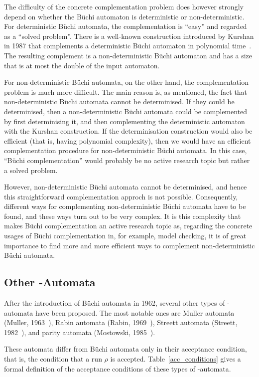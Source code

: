 The difficulty of the concrete complementation problem does however strongly depend on whether the Büchi automaton is deterministic or non-deterministic. For deterministic Büchi automata, the complementation is ``easy'' and regarded as a ``solved problem''. There is a well-known construction introduced by Kurshan in 1987 that complements a deterministic Büchi automaton in polynomial time~\cite{Kurshan198759}. The resulting complement is a non-deterministic Büchi automaton and has a size that is at most the double of the input automaton.

For non-deterministic Büchi automata, on the other hand, the complementation problem is much more difficult. The main reason is, as mentioned, the fact that non-deterministic Büchi automata cannot be determinised. If they could be determinised, then a non-deterministic Büchi automata could be complemented by first determinising it, and then complementing the deterministic automaton with the Kurshan construction. If the determinisation construction would also be efficient (that is, having polynomial complexity), then we would have an efficient complementation procedure for non-deterministic Büchi automata. In this case, ``Büchi complementation'' would probably be no active research topic but rather a solved problem.

However, non-deterministic Büchi automata cannot be determinised, and hence this straightforward complementation approch is not possible. Consequently, different ways for complementing non-deterministic Büchi automata have to be found, and these ways turn out to be very complex. It is this complexity that makes Büchi complementation an active research topic as, regarding the concrete usages of Büchi complementation in, for example, model checking, it is of great importance to find more and more efficient ways to complement non-deterministic Büchi automata. 


\subsection{Other \om-Automata}
After the introduction of Büchi automata in 1962, several other types of \om-automata have been proposed. The most notable ones are Muller automata (Muller, 1963~\cite{1963_muller}), Rabin automata (Rabin, 1969~\cite{rabin1969decidability}), Streett automata (Streett, 1982~\cite{Streett1982121}), and parity automata (Mostowski, 1985~\cite{1985_mostowski}).

These automata differ from Büchi automata only in their acceptance condition, that is, the condition that a run $\rho$ is accepted. Table~\ref{acc_conditions} gives a formal definition of the acceptance conditions of these types of \om-automata.

